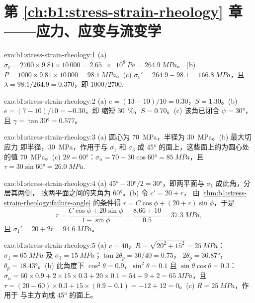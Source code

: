 \section*{第 \ref{ch:b1:stress-strain-rheology} 章——应力、应变与流变学}

\begin{solution}{exo:b1:stress-strain-rheology:1}
(a) $\sigma_v = 2700\times9.81\times10\,000 = \qty{2.65e8}{Pa} = \qty{264.9}{MPa}$。
(b) $P = 1000\times9.81\times10\,000 = \qty{98.1}{MPa}$。(c) $\sigma_v' =
264.9 - 98.1 = \qty{166.8}{MPa}$，且 $\lambda = 98.1/264.9 = 0.370$，即
$1000/2700$.
\end{solution}

\begin{solution}{exo:b1:stress-strain-rheology:2}
(a) $e = (13-10)/10 = 0.30$，$S = 1.30$。(b) $e = (7-10)/10 = -0.30$，即
缩短 \qty{30}{\percent}，$S = 0.70$。(c) 该角已闭合
$\psi = \ang{30}$，且 $\gamma = \tan\ang{30} = 0.577$。
\end{solution}

\begin{solution}{exo:b1:stress-strain-rheology:3}
(a) 圆心为 \qty{70}{MPa}，半径为 \qty{30}{MPa}。(b) 最大切应力
即半径，\qty{30}{MPa}，作用于与 $\sigma_1$ 和
$\sigma_3$ 成 \ang{45} 的面上，这些面上的为圆心处的值 \qty{70}{MPa}。(c)
$2\theta = \ang{60}$：$\sigma_n = 70 + 30\cos\ang{60} = \qty{85}{MPa}$，且
$\tau = 30\sin\ang{60} = \qty{26.0}{MPa}$.
\end{solution}

\begin{solution}{exo:b1:stress-strain-rheology:4}
(a) $\ang{45} - \ang{30}/2 = \ang{30}$，即两平面与 $\sigma_1$ 成此角，分居其两侧，
故两平面之间的夹角为 \ang{60}。(b) 令 $c' = 20 + r$，
由 \cref{thm:b1:stress-strain-rheology:failure-angle} 的条件得
$r = C\cos\phi + (20 + r)\sin\phi$，于是
\[
  r = \frac{C\cos\phi + 20\sin\phi}{1 - \sin\phi} = \frac{8.66 + 10}{0.5}
    = \qty{37.3}{MPa},
\]
且 $\sigma_1' = 20 + 2r = \qty{94.6}{MPa}$。
\end{solution}

\begin{solution}{exo:b1:stress-strain-rheology:5}
(a) $c = 40$，$R = \sqrt{20^2 + 15^2} = \qty{25}{MPa}$：$\sigma_1 =
\qty{65}{MPa}$ 及 $\sigma_3 = \qty{15}{MPa}$；$\tan2\theta_p = 30/40 = 0.75$，
$2\theta_p = \ang{36.87}$，$\theta_p = \ang{18.43}$。(b) 此角度下
$\cos^2\theta = 0.9$，$\sin^2\theta = 0.1$ 且 $\sin\theta\cos\theta = 0.3$：
$\sigma_n = 60\times0.9 + 2\times15\times0.3 + 20\times0.1 = 54 + 9 + 2 =
\qty{65}{MPa}$，且 $\tau = (20-60)\times0.3 + 15\times(0.9-0.1) = -12 + 12 =
0$。(c) $R = \qty{25}{MPa}$，作用于
与主方向成 \ang{45} 的面上。
\end{solution}

